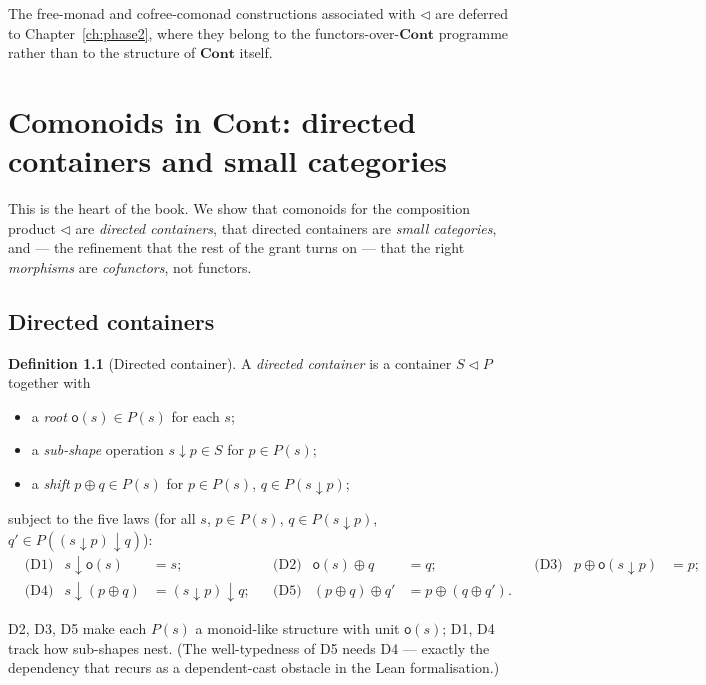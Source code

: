 \documentclass[11pt,a4paper]{book}
\newcommand{\Cont}{\mathbf{Cont}}
\newcommand{\cont}[2]{#1 \triangleleft #2}
\theoremstyle{plain}
\theoremstyle{definition}
\newtheorem{Definition}[Theorem]{Definition}
\theoremstyle{remark}
\begin{document}
The free-monad and cofree-comonad constructions associated with $\triangleleft$
are deferred to Chapter~\ref{ch:phase2}, where they belong to the functors-over-$\Cont$
programme rather than to the structure of $\Cont$ itself.

\chapter{Comonoids in \texorpdfstring{$\Cont$}{Cont}: directed containers and small categories}
\label{ch:comonoids}\label{ch:phase2dummy}

This is the heart of the book. We show that comonoids for the composition product
$\triangleleft$ are \emph{directed containers}, that directed containers are
\emph{small categories}, and --- the refinement that the rest of the grant turns
on --- that the right \emph{morphisms} are \emph{cofunctors}, not functors.

\section{Directed containers}

\begin{Definition}[Directed container]\label{def:dcont}
A \emph{directed container} is a container $\cont SP$ together with
\begin{itemize}[nosep]
  \item a \emph{root} $\mathsf o(s)\in P(s)$ for each $s$;
  \item a \emph{sub-shape} operation $s\downarrow p\in S$ for $p\in P(s)$;
  \item a \emph{shift} $p\oplus q\in P(s)$ for $p\in P(s)$, $q\in P(s\downarrow p)$;
\end{itemize}
subject to the five laws (for all $s$, $p\in P(s)$, $q\in P(s\downarrow p)$,
$q'\in P((s\downarrow p)\downarrow q)$):
\begin{align*}
  &\text{(D1)} & s\downarrow\mathsf o(s)&=s;
  & &\text{(D2)} & \mathsf o(s)\oplus q&=q;
  & &\text{(D3)} & p\oplus\mathsf o(s\downarrow p)&=p;\\
  &\text{(D4)} & s\downarrow(p\oplus q)&=(s\downarrow p)\downarrow q;
  & &\text{(D5)} & (p\oplus q)\oplus q'&=p\oplus(q\oplus q').
\end{align*}
\end{Definition}

\noindent D2, D3, D5 make each $P(s)$ a monoid-like structure with unit
$\mathsf o(s)$; D1, D4 track how sub-shapes nest. (The well-typedness of D5 needs
D4 --- exactly the dependency that recurs as a dependent-cast obstacle in the Lean
formalisation.)
\end{document}
